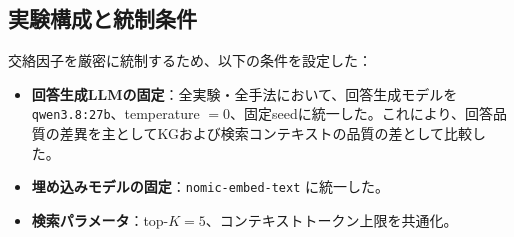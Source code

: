 \documentclass[a4j,dvipdfmx]{jsarticle}
\begin{document}
\subsection{実験構成と統制条件}
交絡因子を厳密に統制するため、以下の条件を設定した：
\begin{itemize}
    \item \textbf{回答生成LLMの固定}：全実験・全手法において、回答生成モデルを \texttt{qwen3.8:27b}、temperature $=0$、固定seedに統一した。これにより、回答品質の差異を主としてKGおよび検索コンテキストの品質の差として比較した。
    \item \textbf{埋め込みモデルの固定}：\texttt{nomic-embed-text} に統一した。
    \item \textbf{検索パラメータ}：top-$K = 5$、コンテキストトークン上限を共通化。
\end{itemize}
\end{document}
